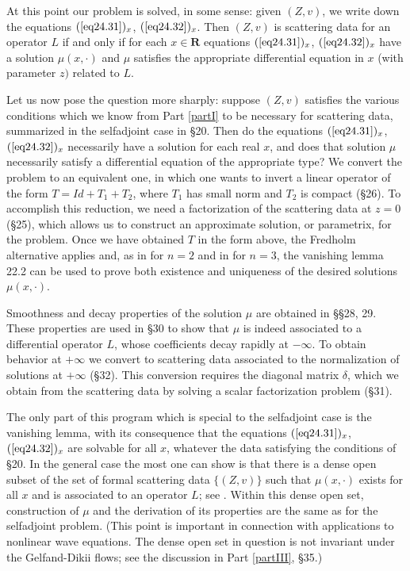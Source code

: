 \documentclass{surv-l}
\theoremstyle{plain}
\theoremstyle{definition}
\numberwithin{equation}{chapter}
\begin{document}
At this point our problem is solved, in some sense: given $(Z, v)$, we write down the equations $(\text{\ref{eq24.31}})_{x}$, $(\text{\ref{eq24.32}})_{x}$. Then $(Z, v)$ is scattering data for an operator $L$ if and only if for each $x\in \mathbf{R}$ equations $(\text{\ref{eq24.31}})_{x}$, $(\text{\ref{eq24.32}})_{x}$ have a solution $\mu(x, \cdot)$ and $\mu$ satisfies the appropriate differential equation in $x$ (with parameter $z)$ related to $L$.


Let us now pose the question more sharply: suppose $(Z, v)$ satisfies the various conditions which we know from Part \ref{partI} to be necessary for scattering data, summarized in the selfadjoint case in \S 20. Then do the equations $(\text{\ref{eq24.31}})_{x}$, $(\text{\ref{eq24.32}})_{x}$ necessarily have a solution for each real $x$, and does that solution $\mu$ necessarily satisfy a differential equation of the appropriate type? We convert the problem to an equivalent one, in which one wants to invert a linear operator of the form $T = Id + T_{1}+T_{2}$, where $T_{1}$ has small norm and $T_{2}$ is compact (\S 26). To accomplish this reduction, we need a factorization of the scattering data at $z=0$ (\S 25), which allows us to construct an approximate solution, or parametrix, for the problem. Once we have obtained $T$ in the form above, the Fredholm alternative applies and, as in \cite{DT} for $n=2$ and in \cite{DTT} for $n=3$, the vanishing lemma 22.2 can be used to prove both existence and uniqueness of the desired solutions $\mu(x,\cdot)$.

Smoothness and decay properties of the solution $\mu$ are obtained in \S\S 28, 29. These properties are used in \S 30 to show that $\mu$ is indeed associated to a differential operator $L$, whose coefficients decay rapidly at $-\infty$. To obtain behavior at $+\infty$ we convert to scattering data associated to the normalization of solutions at $+\infty$ (\S 32). This conversion requires the diagonal matrix $\delta$, which we obtain from the scattering data by solving a scalar factorization problem (\S 31).

The only part of this program which is special to the selfadjoint case is the vanishing lemma, with its consequence that the equations $(\text{\ref{eq24.31}})_{x}$, $(\text{\ref{eq24.32}})_{x}$ are solvable for all $x$, whatever the data satisfying the conditions of \S 20. In the general case the most one can show is that there is a dense open subset of the set of formal scattering data $\{(Z, v)\}$ such that $\mu(x, \cdot)$ exists for all $x$ and is associated to an operator $L$; see \cite{Be}. Within this dense open set, construction of $\mu$ and the derivation of its properties are the same as for the selfadjoint problem. (This point is important in connection with applications to nonlinear wave equations. The dense open set in question is not invariant under the Gelfand-Dikii flows; see the discussion in Part \ref{partIII}, \S 35.)
\setcounter{section}{20}
\end{document}
